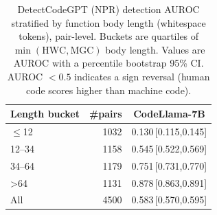 \begin{table}[t]
\centering
\caption{DetectCodeGPT (NPR) detection AUROC stratified by function body length (whitespace tokens), pair-level. Buckets are quartiles of $\min(\text{HWC},\text{MGC})$ body length. Values are AUROC with a percentile bootstrap 95\% CI. AUROC $<0.5$ indicates a sign reversal (human code scores higher than machine code).}
\label{tab:auroc-by-length}
\begin{tabular}{lrc}
\toprule
Length bucket & \#pairs & CodeLlama-7B \\
\midrule
$\leq$12 & 1032 & 0.130\,\tiny[0.115,0.145] \\
12--34 & 1158 & 0.545\,\tiny[0.522,0.569] \\
34--64 & 1179 & 0.751\,\tiny[0.731,0.770] \\
>64 & 1131 & 0.878\,\tiny[0.863,0.891] \\
\midrule
All & 4500 & 0.583\,\tiny[0.570,0.595] \\
\bottomrule
\end{tabular}
\end{table}
